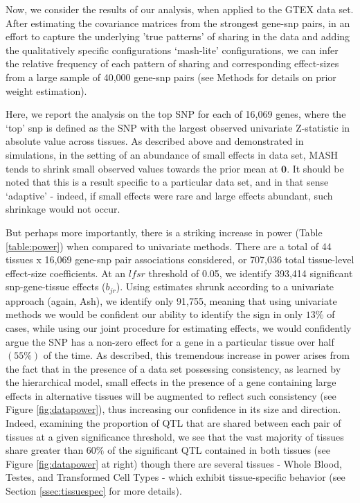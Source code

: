 Now, we consider the results of our analysis, when applied to the GTEX data set. After estimating the covariance matrices from the strongest gene-snp pairs, in an effort to capture the underlying 'true patterns' of sharing in the data and adding the qualitatively specific configurations `mash-lite' configurations, we can infer the relative frequency of each pattern of sharing and corresponding effect-sizes from a large sample of 40,000 gene-snp pairs (see Methods for details on prior weight estimation).

Here, we report the analysis on the top SNP for each of 16,069 genes, where the `top' snp is defined as the SNP with the largest observed univariate Z-statistic in absolute value across tissues. As described above and demonstrated in simulations, in the setting of an abundance of small effects in data set, MASH tends to shrink small observed values towards the prior mean at $\bm{0}$. It should be noted that this is a result specific to a particular data set, and in that sense `adaptive' - indeed, if small effects were rare and large effects abundant, such shrinkage would not occur. 

But perhaps more importantly, there is a striking increase in power (Table \ref{table:power}) when compared to univariate methods. There are a total of 44 tissues x 16,069 gene-snp pair associations considered, or 707,036 total tissue-level effect-size coefficients. At an $lfsr$ threshold of 0.05, we identify 393,414 significant snp-gene-tissue effects ($b_{jr}$). Using estimates shrunk according to a univariate approach (again, Ash),  we identify only 91,755, meaning that using univariate methods we would be confident our ability to identify the sign in only $13\%$ of cases, while using our joint procedure for estimating effects, we would confidently argue the SNP has a non-zero effect for a gene in a particular tissue over half $(55\%)$ of the time. As described, this tremendous increase in power arises from the fact that in the presence of  a data set possessing consistency, as learned by the hierarchical model, small effects in the presence of a gene containing large effects in alternative tissues will be augmented to reflect such consistency (see Figure \ref{fig:datapower}), thus increasing our confidence in its size and direction. Indeed, examining the proportion of QTL that are shared between each pair of tissues at a given significance threshold, we see that the vast majority of tissues share greater than $60\%$ of the significant QTL contained in both tissues (see Figure \ref{fig:datapower} at right) though there are several tissues - Whole Blood, Testes, and Transformed Cell Types - which exhibit tissue-specific behavior (see Section \ref{ssec:tissuespec} for more details).


